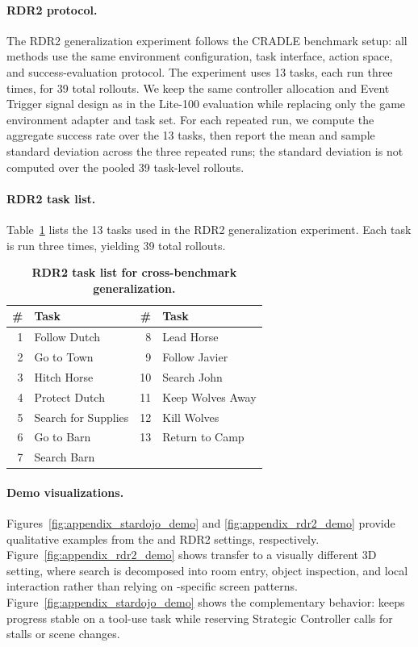 \paragraph{RDR2 protocol.}
\label{sec:appendix_rdr2_protocol}
The RDR2 generalization experiment follows the CRADLE benchmark setup: all
methods use the same environment configuration, task interface, action
space, and success-evaluation protocol. The experiment uses 13 tasks, each run
three times, for 39 total rollouts. We keep the same controller allocation and
Event Trigger signal design as in the Lite-100 evaluation while replacing only
the game environment adapter and task set. For each repeated run, we compute the
aggregate success rate over the 13 tasks, then report the mean and sample
standard deviation across the three repeated runs; the standard deviation is not
computed over the pooled 39 task-level rollouts.

\paragraph{RDR2 task list.}
Table~\mbox{\ref{tab:rdr2_tasks}} lists the 13 tasks used in the RDR2
generalization experiment. Each task is run three times, yielding 39 total
rollouts.

\begin{table}[H]
    \centering
    \small
    \caption{\textbf{RDR2 task list for cross-benchmark generalization.}}
    \label{tab:rdr2_tasks}
    \begin{tabular}{rlrl}
        \toprule
        \# & Task & \# & Task \\
        \midrule
        1 & Follow Dutch & 8 & Lead Horse \\
        2 & Go to Town & 9 & Follow Javier \\
        3 & Hitch Horse & 10 & Search John \\
        4 & Protect Dutch & 11 & Keep Wolves Away \\
        5 & Search for Supplies & 12 & Kill Wolves \\
        6 & Go to Barn & 13 & Return to Camp \\
        7 & Search Barn & & \\
        \bottomrule
    \end{tabular}
\end{table}

\paragraph{Demo visualizations.}
\label{sec:appendix_demo_visualizations}
Figures~\mbox{\ref{fig:appendix_stardojo_demo}} and
\mbox{\ref{fig:appendix_rdr2_demo}} provide qualitative examples from the
\stardojo{} and RDR2 settings, respectively.
Figure~\mbox{\ref{fig:appendix_rdr2_demo}} shows transfer to a visually different
3D setting, where search is decomposed into room entry, object inspection, and
local interaction rather than relying on \stardojo{}-specific screen patterns.
Figure~\mbox{\ref{fig:appendix_stardojo_demo}} shows the complementary
\stardojo{} behavior: \method{} keeps progress stable on a tool-use task while
reserving Strategic Controller calls for stalls or scene changes.



